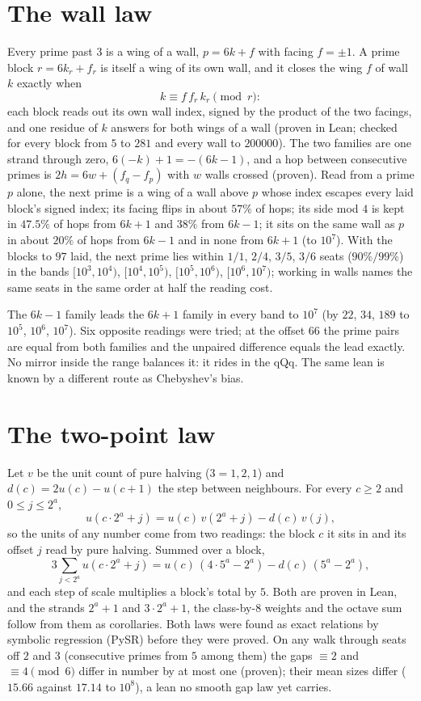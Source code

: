 \documentclass[11pt]{article}
\begin{document}
\section{The wall law}
Every prime past $3$ is a wing of a wall, $p = 6k+f$ with facing $f = \pm1$. A prime block $r = 6k_r + f_r$ is itself a wing of its own wall, and it closes the wing $f$ of wall $k$ exactly when
\[ k \equiv f\, f_r\, k_r \pmod r: \]
each block reads out its own wall index, signed by the product of the two facings, and one residue of $k$ answers for both wings of a wall (proven in Lean; checked for every block from $5$ to $281$ and every wall to $200000$). The two families are one strand through zero, $6(-k)+1 = -(6k-1)$, and a hop between consecutive primes is $2h = 6w + (f_q - f_p)$ with $w$ walls crossed (proven). Read from a prime $p$ alone, the next prime is a wing of a wall above $p$ whose index escapes every laid block's signed index; its facing flips in about $57\%$ of hops; its side mod $4$ is kept in $47.5\%$ of hops from $6k+1$ and $38\%$ from $6k-1$; it sits on the same wall as $p$ in about $20\%$ of hops from $6k-1$ and in none from $6k+1$ (to $10^7$). With the blocks to $97$ laid, the next prime lies within $1/1$, $2/4$, $3/5$, $3/6$ seats ($90\%/99\%$) in the bands $[10^3,10^4)$, $[10^4,10^5)$, $[10^5,10^6)$, $[10^6,10^7)$; working in walls names the same seats in the same order at half the reading cost.

The $6k-1$ family leads the $6k+1$ family in every band to $10^7$ (by $22$, $34$, $189$ to $10^5$, $10^6$, $10^7$). Six opposite readings were tried; at the offset $66$ the prime pairs are equal from both families and the unpaired difference equals the lead exactly. No mirror inside the range balances it: it rides in the qQq. The same lean is known by a different route as Chebyshev's bias.

\section{The two-point law}
Let $v$ be the unit count of pure halving ($3 = 1,2,1$) and $d(c) = 2u(c) - u(c+1)$ the step between neighbours. For every $c\ge2$ and $0\le j\le 2^a$,
\[ u(c\cdot2^a + j) = u(c)\,v(2^a+j) - d(c)\,v(j), \]
so the units of any number come from two readings: the block $c$ it sits in and its offset $j$ read by pure halving. Summed over a block,
\[ 3\sum_{j<2^a} u(c\cdot2^a+j) = u(c)\,(4\cdot5^a - 2^a) - d(c)\,(5^a-2^a), \]
and each step of scale multiplies a block's total by $5$. Both are proven in Lean, and the strands $2^a+1$ and $3\cdot2^a+1$, the class-by-$8$ weights and the octave sum follow from them as corollaries. Both laws were found as exact relations by symbolic regression (PySR) before they were proved. On any walk through seats off $2$ and $3$ (consecutive primes from $5$ among them) the gaps $\equiv 2$ and $\equiv 4 \pmod 6$ differ in number by at most one (proven); their mean sizes differ ($15.66$ against $17.14$ to $10^8$), a lean no smooth gap law yet carries.
\end{document}
